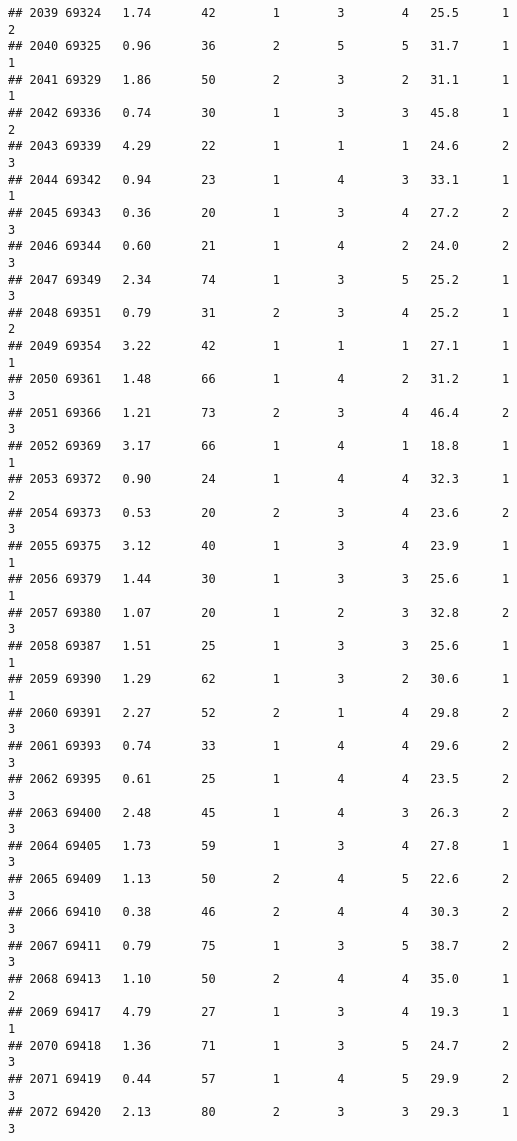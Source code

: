 \documentclass[
]{article}
\begin{document}
\begin{verbatim}
## 2039 69324   1.74       42        1        3        4   25.5      1      2
## 2040 69325   0.96       36        2        5        5   31.7      1      1
## 2041 69329   1.86       50        2        3        2   31.1      1      1
## 2042 69336   0.74       30        1        3        3   45.8      1      2
## 2043 69339   4.29       22        1        1        1   24.6      2      3
## 2044 69342   0.94       23        1        4        3   33.1      1      1
## 2045 69343   0.36       20        1        3        4   27.2      2      3
## 2046 69344   0.60       21        1        4        2   24.0      2      3
## 2047 69349   2.34       74        1        3        5   25.2      1      3
## 2048 69351   0.79       31        2        3        4   25.2      1      2
## 2049 69354   3.22       42        1        1        1   27.1      1      1
## 2050 69361   1.48       66        1        4        2   31.2      1      3
## 2051 69366   1.21       73        2        3        4   46.4      2      3
## 2052 69369   3.17       66        1        4        1   18.8      1      1
## 2053 69372   0.90       24        1        4        4   32.3      1      2
## 2054 69373   0.53       20        2        3        4   23.6      2      3
## 2055 69375   3.12       40        1        3        4   23.9      1      1
## 2056 69379   1.44       30        1        3        3   25.6      1      1
## 2057 69380   1.07       20        1        2        3   32.8      2      3
## 2058 69387   1.51       25        1        3        3   25.6      1      1
## 2059 69390   1.29       62        1        3        2   30.6      1      1
## 2060 69391   2.27       52        2        1        4   29.8      2      3
## 2061 69393   0.74       33        1        4        4   29.6      2      3
## 2062 69395   0.61       25        1        4        4   23.5      2      3
## 2063 69400   2.48       45        1        4        3   26.3      2      3
## 2064 69405   1.73       59        1        3        4   27.8      1      3
## 2065 69409   1.13       50        2        4        5   22.6      2      3
## 2066 69410   0.38       46        2        4        4   30.3      2      3
## 2067 69411   0.79       75        1        3        5   38.7      2      3
## 2068 69413   1.10       50        2        4        4   35.0      1      2
## 2069 69417   4.79       27        1        3        4   19.3      1      1
## 2070 69418   1.36       71        1        3        5   24.7      2      3
## 2071 69419   0.44       57        1        4        5   29.9      2      3
## 2072 69420   2.13       80        2        3        3   29.3      1      3

\end{verbatim}
\end{document}

